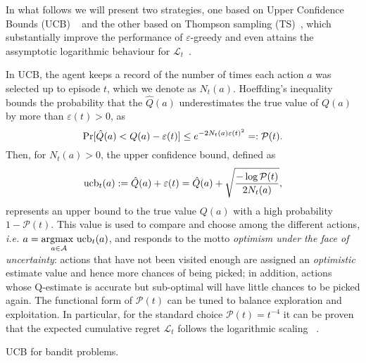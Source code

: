 In what follows we will present two strategies, one based on Upper Confidence Bounds (UCB) ~\cite{Lai1985,Agrawal1995,Auer2002} and the other based on Thompson sampling (TS)~\cite{Thompson1933,Thompson1935,Scott2010,Russo2018}, which substantially improve the performance of $\varepsilon$-greedy and even attains the assymptotic logarithmic behaviour for $\mathcal{L}_t$~\cite{TSoptimal}.%

In UCB, the agent keeps a record of the number of times each action $a$ was selected up to episode $t$, which we denote as $N_{t}(a)$. Hoeffding's inequality bounds the probability that the $\hat{Q}(a)$ underestimates the true value of ${Q}(a)$  by more than $\varepsilon(t)>0$, as
\begin{equation}\label{eq:ucbeq}\small
{\rm Pr}[ \hat{Q}(a)<Q(a)-{\varepsilon}(t) ] \leq e^{- 2 N_{t}(a) {\varepsilon}(t)^{2}} =: \mathcal{P}(t).
\end{equation}
Then, for  $N_{t}(a)>0$, the upper confidence bound, defined as
\begin{equation}\label{eq:ucbeq2}
{\rm ucb}_{t}(a):=\hat{Q}(a)+\varepsilon(t) = \hat{Q}(a)+\sqrt{\frac{-\log \mathcal{P}(t)}{2 N_{t}(a)}} ,
\end{equation}
represents an upper bound to the true value ${Q}(a)$ with a high probability $1-\mathcal{P}(t)$.
This value is used to compare and choose among the different actions, \textit{i.e.}
$a = \underset{a \in \mathcal{A}}{\text{argmax }}\mathrm{ucb}_t(a)$, and responds to the motto \textit{optimism under the face of uncertainty}: actions that have not been visited enough are assigned an \textit{optimistic} estimate value and hence more chances of being picked; in addition, actions whose Q-estimate is accurate but sub-optimal will have little chances to be picked again. The functional form of $\mathcal{P}(t)$ can be tuned to balance exploration and exploitation. In particular, for the standard choice $\mathcal{P}(t) = t^{-4}$ it can be proven that the expected cumulative regret $\mathcal{L}_t$ follows the logarithmic scaling ~\cite{Auer2002, banditbook}.

\begin{algorithm}[h]\label{alg:ucbandit}
  \DontPrintSemicolon
  \SetAlgoNoEnd

\caption{UCB for bandit problems.}
\end{algorithm}


